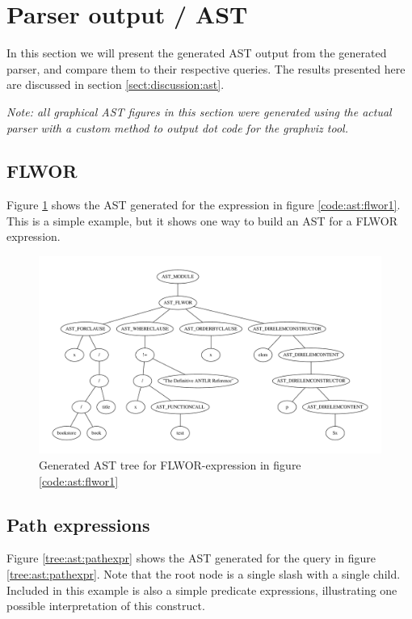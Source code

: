 \section{Parser output / AST}
\label{sect:results:parser_output_ast}
In this section we will present the generated AST output from the generated
parser, and compare them to their respective queries. The results presented here
are discussed in section \ref{sect:discussion:ast}.

\emph{Note: all graphical AST figures in this section were generated using the
actual parser with a custom method to output dot code for the graphviz tool.}

\subsection{FLWOR}
Figure \ref{tree:ast:flwor1} shows the AST generated for the expression in
figure \ref{code:ast:flwor1}. This is a simple example, but it shows one way to
build an AST for a FLWOR expression.

\pagebreak
\begin{figure}[h!]

\caption{FLWOR expression example, generates AST seen in figure \ref{tree:ast:flwor1}}
\label{code:ast:flwor1}
\centering
 \includegraphics[width=1\textwidth]{img/graphs/flwor1}
\caption{Generated AST tree for FLWOR-expression in figure \ref{code:ast:flwor1}}
\label{tree:ast:flwor1}
\end{figure}

\subsection{Path expressions}
Figure \ref{tree:ast:pathexpr} shows the AST generated for the query in figure
\ref{tree:ast:pathexpr}. Note that the root node is a single slash with a
single child. Included in this example is also a simple predicate expressions,
illustrating one possible interpretation of this construct.

